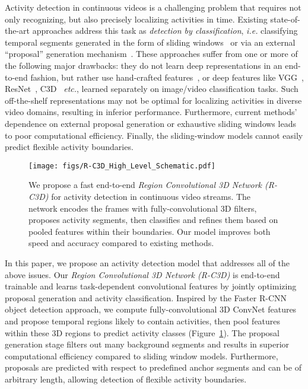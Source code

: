 \documentclass[10pt,twocolumn,letterpaper]{article}
\newcommand{\modelnamelong}[0]{\textit{Region Convolutional 3D Network (R-C3D) }}
\begin{document}
Activity detection in continuous videos is a challenging problem that requires not only recognizing, but also precisely localizing activities in time.
Existing state-of-the-art approaches address this task as \textit{detection by classification}, \textit{i.e.} classifying temporal segments generated in the form of sliding windows~\cite{karaman2014fast, oneata2014lear, shou2016temporal, wang2014action} or via an external ``proposal'' generation mechanism~\cite{caba2016fast, Wang2016}. These approaches suffer from one or more of the following major drawbacks: they do not learn deep representations in an end-to-end fashion, but rather use hand-crafted features~\cite{wang2013action, wang2014video}, or deep features like VGG~\cite{simonyan2014very}, ResNet~\cite{he2016deep}, C3D~\cite{tran2015learning} \textit{etc.}, learned separately on image/video classification tasks. Such off-the-shelf representations may not be optimal for localizing activities in diverse video domains, resulting in inferior performance. Furthermore, current methods' dependence on external proposal generation or exhaustive sliding windows leads to poor computational efficiency. Finally, the sliding-window models cannot easily predict flexible activity boundaries.

\begin{figure}[t]
\begin{center}
\texttt{[image: figs/R-C3D\_High\_Level\_Schematic.pdf]}
\end{center}
\vskip -0.15in
\caption{We propose a fast end-to-end \modelnamelong for activity detection in continuous video streams. The network encodes the frames with fully-convolutional 3D filters, proposes activity segments, then classifies and refines them based on pooled features within their boundaries. Our model improves both speed and accuracy compared to existing methods.}
\label{fig:schematic}
\vskip -0.2in
\end{figure}

In this paper, we propose an activity detection model that addresses all of the above issues. Our \modelnamelong is end-to-end trainable and learns task-dependent convolutional features by jointly optimizing proposal generation and activity classification.
Inspired by the Faster R-CNN~\cite{ren2015faster} object detection approach, we compute fully-convolutional 3D ConvNet features and propose temporal regions likely to contain activities, then pool features within these 3D regions to predict activity classes (Figure~\ref{fig:schematic}).
The proposal generation stage filters out many background segments and results in superior computational efficiency compared to sliding window models.
Furthermore, proposals are predicted with respect to predefined anchor segments and can be of arbitrary length, allowing detection of flexible activity boundaries.
\end{document}

